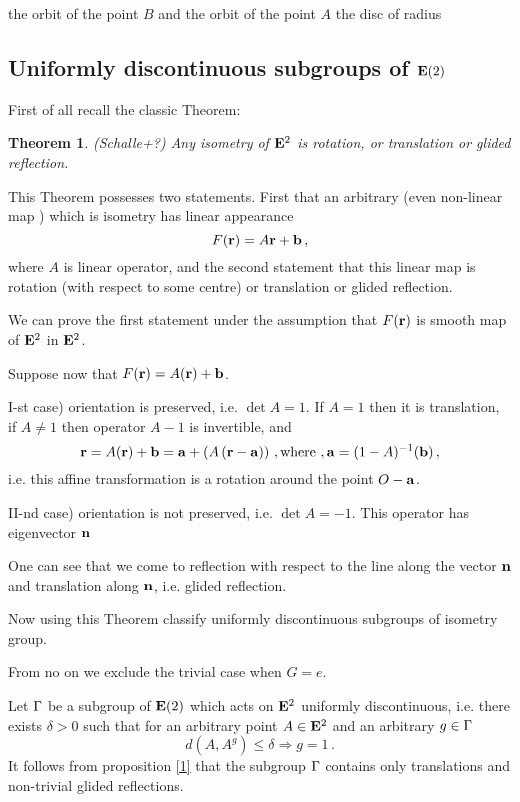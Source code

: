\documentclass[12pt]{article}
\newtheorem{theorem}{Theorem}
\theoremstyle{definition}
\numberwithin{equation}{section}
\begin{document}
the orbit of the point $B$ and the orbit of the point $A$
the  disc of radius


\subsection {Uniformly discontinuous subgroups of ${\bf E}(2)$}


  First of all recall the classic Theorem:
 
\begin{theorem} (Schalle+?)
  Any isometry of ${\bf E}^2$ is rotation, or translation or
  glided reflection.
\end{theorem}

  This Theorem possesses two statements. First that an arbitrary
(even non-linear map ) which is isometry has linear appearance
            $$
   F({\bf r})=A{\bf r}+{\bf b}\,,
            $$ 
where $A$ is linear operator, and the second statement
that this linear map is rotation (with respect to some centre)
or translation or glided reflection.

    We can prove the first statement under the assumption that
  $F({\bf r})$ is smooth map of ${\bf E}^2$ in ${\bf E}^2$.


     Suppose now  that $F({\bf r})=A({\bf r})+{\bf b}$.
   
\smallskip

  I-st case) orientation is preserved, i.e. $\det A=1$.
If $A=1$ then it is translation, if $A\not=1$ then operator
$A-1$ is invertible, and
              $$
{\bf r}=A({\bf r})+{\bf b}={\bf a}+\left(A\left({\bf r}-{\bf a}\right)\right)\,,
{\rm where}\,\,,  {\bf a}= (1-A)^{-1}({\bf b})\,,
              $$
i.e. this affine transformation is a rotation around
the point $O-{\bf a}$.

\smallskip

II-nd case) orientation is not preserved, i.e. $\det A=-1$.
  This operator has eigenvector  ${\bf n}$ 

One can see that we come to reflection with respect to the line
along the vector ${\bf n}$ and translation along ${\bf n}$, i.e. glided
reflection.
 


  Now using this Theorem classify 
   uniformly discontinuous subgroups of isometry group.

From no on we exclude the trivial case
when $G={e}$.


   Let ${\Gamma}$ be a subgroup of ${\bf E}(2)$ which acts on
${\bf E}^2$ uniformly discontinuous, i.e. there exists
$\delta>0$ such that for an arbitrary point $A\in {\bf E}^2$
and an arbitrary $g\in {\Gamma}$
                  $$
                 d(A,A^g)\leq \delta \Rightarrow g=1\,.
                   $$
 It follows from proposition \ref{1} that the subgroup ${\Gamma}$
contains only translations and non-trivial glided reflections.
\end{document}
